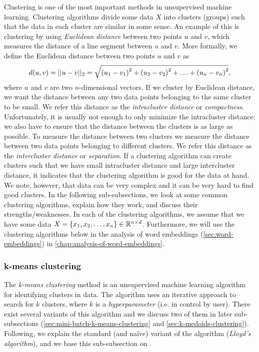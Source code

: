 Clustering is one of the most important methods in unsupervised machine learning. Clustering algorithms divide some data $X$ into clusters (groups) such that the data in each cluster are similar in some sense. An example of this is clustering by using \textit{Euclidean distance} between two points $u$ and $v$, which measures the distance of a line segment between $u$ and $v$. More formally, we define the Euclidean distance between two points $u$ and $v$ as
\begin{align}
    d(u, v) = ||u-v||_2 = \sqrt{\left(u_1 - v_1\right)^2 + \left(u_2 - v_2\right)^2 + \ldots + \left(u_n - v_n\right)^2},
    \label{eqn:euclidean-distance}
\end{align}
where $u$ and $v$ are two $n$-dimensional vectors. If we cluster by Euclidean distance, we want the distance between any two data points belonging to the same cluster to be small. We refer this distance as the \textit{intracluster distance} or \textit{compactness}. Unfortunately, it is usually not enough to only minimize the intracluster distance; we also have to ensure that the distance between the clusters is as large as possible. To measure the distance between two clusters we measure the distance between two data points belonging to different clusters. We refer this distance as the \textit{intercluster distance} or \textit{separation}. If a clustering algorithm can create clusters such that we have small intracluster distance and large intercluster distance, it indicates that the clustering algorithm is good for the data at hand. We note, however, that data can be very complex and it can be very hard to find good clusters. In the following sub-subsections, we look at some common clustering algorithms, explain how they work, and discuss their strengths/weaknesses. In each of the clustering algorithms, we assume that we have some data $X = \left\{x_1, x_2, \ldots, x_n\right\} \in \mathbb{R}^{n \times d}$. Furthermore, we will use the clustering algorithms below in the analysis of word embeddings (\cref{sec:word-embeddings}) in \cref{chap:analysis-of-word-embeddings}.

\subsubsection{k-means clustering}
\label{sec:k-means-clustering}
The \textit{k-means clustering} method \cite[Section 9.1]{bishop2006} is an unsupervised machine learning algorithm for identifying clusters in data. The algorithm uses an iterative approach to search for $k$ clusters, where $k$ is a \textit{hyperparameter} (i.e. in control by user). There exist several variants of this algorithm and we discuss two of them in later sub-subsections (\cref{sec:mini-batch-k-means-clustering} and \cref{sec:k-medoids-clustering}). Following, we explain the standard (and naïve) variant of the algorithm (\textit{Lloyd's algorithm}), and we base this sub-subsection on \cite[Section 9.1]{bishop2006}.

